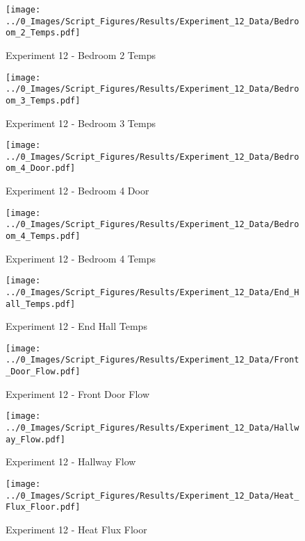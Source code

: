 	\begin{figure}[H]
		\centering
		\texttt{[image: ../0\_Images/Script\_Figures/Results/Experiment\_12\_Data/Bedroom\_2\_Temps.pdf]}
		\caption[]{Experiment 12 - Bedroom 2 Temps}
	\end{figure}
 
	\clearpage

	\begin{figure}[H]
		\centering
		\texttt{[image: ../0\_Images/Script\_Figures/Results/Experiment\_12\_Data/Bedroom\_3\_Temps.pdf]}
		\caption[]{Experiment 12 - Bedroom 3 Temps}
	\end{figure}
 

	\begin{figure}[H]
		\centering
		\texttt{[image: ../0\_Images/Script\_Figures/Results/Experiment\_12\_Data/Bedroom\_4\_Door.pdf]}
		\caption[]{Experiment 12 - Bedroom 4 Door}
	\end{figure}
 
	\clearpage

	\begin{figure}[H]
		\centering
		\texttt{[image: ../0\_Images/Script\_Figures/Results/Experiment\_12\_Data/Bedroom\_4\_Temps.pdf]}
		\caption[]{Experiment 12 - Bedroom 4 Temps}
	\end{figure}
 

	\begin{figure}[H]
		\centering
		\texttt{[image: ../0\_Images/Script\_Figures/Results/Experiment\_12\_Data/End\_Hall\_Temps.pdf]}
		\caption[]{Experiment 12 - End Hall Temps}
	\end{figure}
 
	\clearpage

	\begin{figure}[H]
		\centering
		\texttt{[image: ../0\_Images/Script\_Figures/Results/Experiment\_12\_Data/Front\_Door\_Flow.pdf]}
		\caption[]{Experiment 12 - Front Door Flow}
	\end{figure}
 

	\begin{figure}[H]
		\centering
		\texttt{[image: ../0\_Images/Script\_Figures/Results/Experiment\_12\_Data/Hallway\_Flow.pdf]}
		\caption[]{Experiment 12 - Hallway Flow}
	\end{figure}
 
	\clearpage

	\begin{figure}[H]
		\centering
		\texttt{[image: ../0\_Images/Script\_Figures/Results/Experiment\_12\_Data/Heat\_Flux\_Floor.pdf]}
		\caption[]{Experiment 12 - Heat Flux Floor}
	\end{figure}
 

